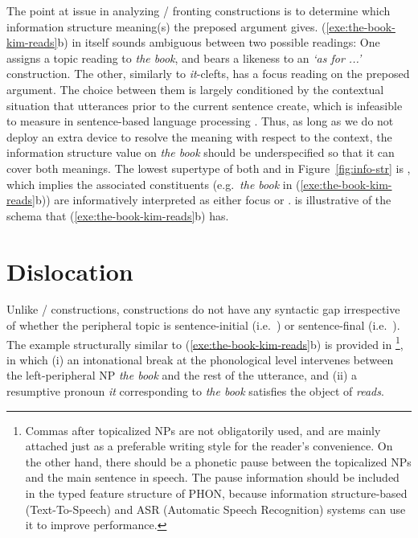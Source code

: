 The point at issue in analyzing / fronting
constructions is to determine which information structure meaning(s)
the preposed argument gives. (\ref{exe:the-book-kim-reads}b) in itself
sounds ambiguous between two possible readings: One assigns a topic
reading to \textit{the book}, and bears a likeness to an \textit{`as
  for ...'}  construction. The other, similarly to \textit{it}-clefts,
has a focus reading on the preposed argument. The choice between them
is largely conditioned by the contextual situation that utterances
prior to the current sentence create, which is infeasible to measure
in sentence-based language processing \citep{kuhn:96}. Thus, as long
as we do not deploy an extra device to resolve the meaning with
respect to the context, the information structure value on \textit{the
  book} should be underspecified so that it can cover both
meanings. The lowest supertype of both
 and  in Figure~\ref{fig:info-str} is
, which implies the associated constituents
(e.g.\ \textit{the book} in (\ref{exe:the-book-kim-reads}b)) are
informatively interpreted as either focus or
.  is illustrative of the
schema that (\ref{exe:the-book-kim-reads}b) has.







\section{Dislocation}
\label{10:sec:dislocation}


Unlike /  constructions,
 constructions do not have any syntactic gap
irrespective of whether the peripheral topic is sentence-initial
(i.e.\ ) or sentence-final (i.e.\ ). The example structurally similar to
(\ref{exe:the-book-kim-reads}b) is provided in
\footnote{Commas after topicalized
  NPs are not obligatorily used, and are mainly attached just as a
  preferable writing style for the reader's convenience.  On the other
  hand, there should be a phonetic pause between the topicalized NPs
  and the main sentence in speech. The pause information should be
  included in the typed feature structure of PHON, because information
  structure-based  (Text-To-Speech) and ASR (Automatic Speech
  Recognition) systems can use it to improve performance.}, in which
(i) an intonational break at the phonological level intervenes between
the left-peripheral NP \textit{the book} and the rest of the
utterance, and (ii) a resumptive pronoun \textit{it} corresponding to
\textit{the book} satisfies the object of \textit{reads}.


